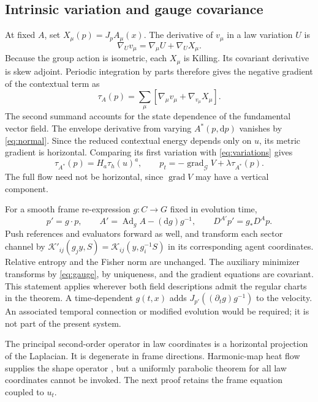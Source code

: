 \documentclass[11pt]{article}
\newcommand{\G}{\mathcal G}
\newcommand{\grad}{\operatorname{grad}}
\newcommand{\Ad}{\operatorname{Ad}}
\newcommand{\dd}{\mathrm d}
\begin{document}
\subsection{Intrinsic variation and gauge covariance}

At fixed $A$, set $X_\mu(p)=J_pA_\mu(x)$. The derivative of $v_\mu$ in a law variation $U$ is
\begin{equation}
 \nabla_Uv_\mu=\nabla_\mu U+\nabla_UX_\mu.
\end{equation}
Because the group action is isometric, each $X_\mu$ is Killing. Its covariant derivative is skew adjoint. Periodic integration by parts therefore gives the negative gradient of the contextual term as
\begin{equation}
 \tau_A(p)=\sum_\mu\left[\nabla_\mu v_\mu+
                                    \nabla_{v_\mu}X_\mu\right].
 \label{eq:tauA}
\end{equation}
The second summand accounts for the state dependence of the fundamental vector field. The envelope derivative from varying $A^*(p,\dd p)$ vanishes by \eqref{eq:normal}. Since the reduced contextual energy depends only on $u$, its metric gradient is horizontal. Comparing its first variation with \eqref{eq:variations} gives
\begin{equation}
 \tau_{A^*}(p)=H_a\tau_h(u)^a,
 \qquad p_t=-\grad_{\G}V+\lambda\tau_{A^*}(p).
 \label{eq:intrinsic}
\end{equation}
The full flow need not be horizontal, since $\grad V$ may have a vertical component.

For a smooth frame re-expression $g:C\to G$ fixed in evolution time,
\begin{equation}
 p'=g\cdot p,\qquad
 A'=\Ad_gA-(\dd g)g^{-1},\qquad
 D^{A'}p'=g_*D^Ap.
 \label{eq:gauge}
\end{equation}
Push references and evaluators forward as well, and transform each sector channel by
$\mathcal K'_{ij}(g_jy,S)=\mathcal K_{ij}(y,g_i^{-1}S)$
in its corresponding agent coordinates. Relative entropy and the Fisher norm are unchanged. The auxiliary minimizer transforms by \eqref{eq:gauge}, by uniqueness, and the gradient equations are covariant. This statement applies wherever both field descriptions admit the regular charts in the theorem. A time-dependent $g(t,x)$ adds $J_{p'}((\partial_tg)g^{-1})$ to the velocity. An associated temporal connection or modified evolution would be required; it is not part of the present system.

The principal second-order operator in law coordinates is a horizontal projection of the Laplacian. It is degenerate in frame directions. Harmonic-map heat flow supplies the shape operator \cite{Eells1964}, but a uniformly parabolic theorem for all law coordinates cannot be invoked. The next proof retains the frame equation coupled to $u_t$.
\end{document}
